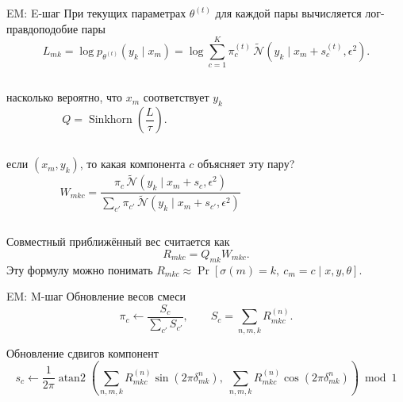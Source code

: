 \documentclass[aspectratio=43, 10pt]{beamer}
\newcommand{\cN}{\mathcal{N}}
\begin{document}
\begin{frame}{EM: E-шаг}
\small
При текущих параметрах $\theta^{(t)}$ для каждой пары вычисляется лог-правдоподобие пары
\[
  L_{mk}
  =
  \log p_{\theta^{(t)}}(y_k\mid x_m)
  =
  \log\sum_{c=1}^{K}
  \pi_c^{(t)}\,
  \widetilde{\cN}\!\left(y_k\mid x_m+s_c^{(t)},\epsilon^2\right).
\]

\vspace{0.5em}
\begin{columns}[T]
насколько вероятно, что $x_m$ соответствует $y_k$
\[
  Q=\operatorname{Sinkhorn}\!\left(\frac{L}{\tau}\right).
\]
\end{columns}

\vspace{0.5em}
\begin{columns}[T]
если $(x_m,y_k)$, то какая компонента $c$ объясняет эту пару?
\[
  W_{mkc}
  =
  \frac{
    \pi_c\,\widetilde{\cN}\!\left(y_k\mid x_m+s_c,\epsilon^2\right)
  }{
    \sum_{c'}\pi_{c'}\,\widetilde{\cN}\!\left(y_k\mid x_m+s_{c'},\epsilon^2\right)
  }
\]
\end{columns}

\vspace{4em}
Совместный приближённый вес считается как
\[
  R_{mkc}=Q_{mk}W_{mkc}.
\]
Эту формулу можно понимать $R_{mkc}\approx\Pr[\sigma(m)=k,\ c_m=c\mid x,y,\theta]$.

\end{frame}

\begin{frame}{EM: M-шаг}
\small
Обновление весов смеси
\[
  \pi_c
  \leftarrow
  \frac{S_c}{\sum_{c'}S_{c'}},
  \qquad
  S_c
  =
  \sum_{n,m,k}
  R^{(n)}_{mkc}.
\]

\vspace{0.6em}
Обновление сдвигов компонент
\[
  s_c
  \leftarrow
  \frac1{2\pi}
  \operatorname{atan2}\!\left(
    \sum_{n,m,k}
    R^{(n)}_{mkc}
    \sin(2\pi\delta^n_{mk}),\;
    \sum_{n,m,k}
    R^{(n)}_{mkc}
    \cos(2\pi\delta^n_{mk})
  \right)
  \bmod 1
\]
\end{frame}
\end{document}
